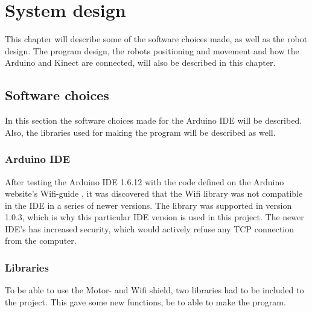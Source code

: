 \chapter{System design}
\label{chap:System design}
This chapter will describe some of the software choices made, as well as the robot design. The program design, the robots positioning and movement and how the Arduino and Kinect are connected, will also be described in this chapter. 

\section{Software choices}
\label{sec:Software choices}
In this section the software choices made for the Arduino IDE will be described. Also, the libraries used for making the program will be described as well. 
\subsection{Arduino IDE}
\label{sec:Arduino IDE}
After testing the Arduino IDE 1.6.12 with the code defined on the Arduino website's Wifi-guide \citep{wg}, it was discovered that the Wifi library was not compatible in the IDE in a series of newer versions. The library was supported in version 1.0.3, which is why this particular IDE version is used in this project. The newer IDE's has increased security, which would actively refuse any TCP connection from the computer.

\subsection{Libraries}
\label{sec:Libraries}
To be able to use the Motor- and Wifi shield, two libraries had to be included to the project. This gave some new functions, be to able to make the program. 


